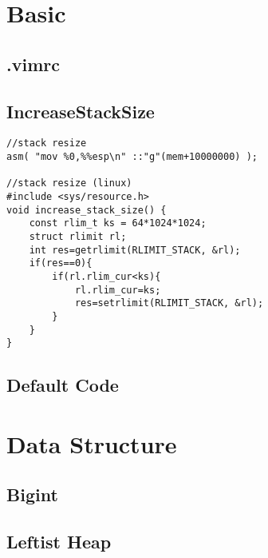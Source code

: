 \documentclass[10pt,twocolumn,oneside]{article}
\begin{document}
\pagestyle{fancy}
\fancyfoot{}
\fancyhead[R]{\thepage}
\renewcommand{\headrulewidth}{0.4pt}
\renewcommand{\contentsname}{Contents} 

\scriptsize
\tableofcontents
\section{Basic}
\subsection{.vimrc}




\newpage

\subsection{IncreaseStackSize}
\begin{lstlisting}
//stack resize
asm( "mov %0,%%esp\n" ::"g"(mem+10000000) );

//stack resize (linux)
#include <sys/resource.h>
void increase_stack_size() {
	const rlim_t ks = 64*1024*1024;
	struct rlimit rl;
	int res=getrlimit(RLIMIT_STACK, &rl);
	if(res==0){
		if(rl.rlim_cur<ks){
			rl.rlim_cur=ks;
			res=setrlimit(RLIMIT_STACK, &rl);
		}
	}
}
\end{lstlisting}

\subsection{Default Code}

\newpage

\section{Data Structure}
\subsection{Bigint}


\subsection{Leftist Heap}

\newpage
\end{document}
